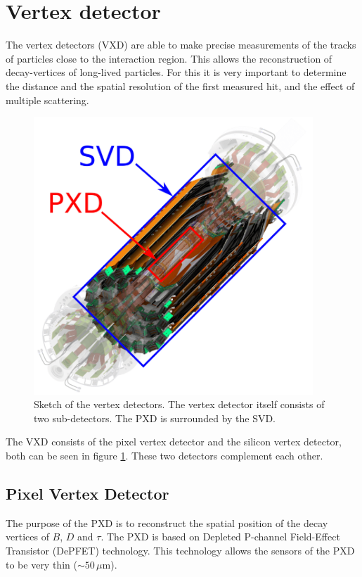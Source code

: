 \documentclass[a4paper,11pt,twosided,final,german,openbib,pdftex,listof=totoc,bibliography=totoc]{scrbook}
\begin{document}
\section{Vertex detector}
\label{sec:vertexDet}

The vertex detectors (VXD) are able to make precise measurements of the tracks of particles close to the interaction region. This allows the reconstruction of decay-vertices of long-lived particles. For this it is very important to determine the distance and the spatial resolution of the first measured hit, and the effect of multiple scattering.


\begin{figure}[h!]
	\begin{center}
		\includegraphics[width=10.5cm]{Bilder/PXD_SVD}
	\end{center}
\caption[Vertex Detector]{Sketch of the vertex detectors. The vertex detector itself consists of two sub-detectors. The PXD is surrounded by the SVD. \cite{OnlineDataReduction} }
\label{fig:VertexDet}
\end{figure}

The VXD consists of the pixel vertex detector and the silicon vertex detector, both can be seen in figure \ref{fig:VertexDet}. These two detectors complement each other.


\subsection{Pixel Vertex Detector}
\label{sec:Pixel}
The purpose of the PXD is to reconstruct the spatial position of the decay vertices of $B$, $D$ and $\tau$.
The PXD is based on Depleted P-channel Field-Effect Transistor (DePFET) technology. This technology allows the sensors of the PXD to be very thin ($\sim 50\,\mu\textrm{m}$).
\end{document}
